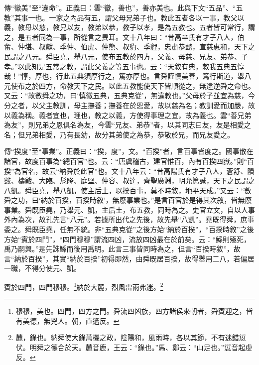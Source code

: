 {\noindent\zhuan{}\fzbyks 傳“徽美”至“違命”。正義曰：雲“徽，善也”，善亦美也。此與下文“五品”、“五教”其事一也。一家之內品有五，謂父母兄弟子也。教此五者各以一事，教父以義，教母以慈，教兄以友，教弟以恭，教子以孝，是為五教也。五者皆可常行，謂之，是五者同為一事，所從言之異耳。文十八年曰：“昔高辛氏有才子八人，伯奮、仲堪、叔獻、季仲、伯虎、仲熊、叔豹、季貍，忠肅恭懿，宣慈惠和，天下之民謂之八元。舜臣堯，舉八元，使布五教於四方，父義、母慈、兄友、弟恭、子孝。”以此知是五常之教，謂此父義之等五事也。云：“天敘有典，敕我五典五惇哉！”惇，厚也，行此五典須厚行之，篤亦厚也。言舜謹慎美善，篤行斯道，舉八元使布之於四方，命教天下之民。以此五教能使天下皆順從之，無違逆舜之命也。又云：“故數舜之功，曰‘慎徽五典，五典克從’，無違教也。”父母於子並宜為慈，今分之者，以父主教訓，母主撫養；撫養在於恩愛，故以慈為名；教訓愛而加嚴，故以義為稱。義者宜也，理也，教之以義，方使得事理之宜，故為義也。雲“善兄弟為友”，則兄弟之恩俱名為友，今雲“兄友、弟恭”者，以其同志曰友，友是相愛之名；但兄弟相愛，乃有長幼，故分其弟使之為恭，恭敬於兄，而兄友愛之。 \par}

{\noindent\zhuan{}\fzbyks 傳“揆度”至“事業”。正義曰：“揆，度”，文。“百揆”者，言百事皆度之。國事散在諸官，故度百事為“總百官”也。云：“唐虞稽古，建官惟百，內有百揆四嶽。”則“百揆”為官名，故云“納舜於此官”也。文十八年云：“昔高陽氏有才子八人，蒼舒、隤敱、檮戭、大臨、尨降、庭堅、仲容、叔達，齊聖廣淵，明允篤誠，天下之民謂之八凱。舜臣堯，舉八凱，使主后土，以揆百事，莫不時敘，地平天成。”又云：“數舜之功，曰‘納於百揆，百揆時敘’，無廢事業也。”是言百官於是得其次敘，皆無廢事業。舜既臣堯，乃舉元、凱，主后土，布五教，同時為之。史官立文，自以人事外內為次，故孔先言“八元”。若據所出代之先後，故先舉“八凱”。堯既得舜，庶事委之。舜既臣堯，任無不統。非“五典克從”之後方始“納於百揆”，“百揆時敘”之後方始“賓於四門”，“四門穆穆”謂流四凶，流放四凶最在於前矣。云：“鯀則殛死，禹乃嗣興。”是先誅鯀而後用禹明。此言三事皆同時為之，但言“百揆時敘”，故言“納於百揆”，其實“納於百揆”初得即然，由舜既居百揆，故得舉用二八，若偏居一職，不得分使元、凱。 \par}

賓於四門，四門穆穆。\footnote{穆穆，美也。四門，四方之門。舜流四凶族，四方諸侯來朝者，舜賓迎之，皆有美德，無兇人。朝，直遙反。}納於大麓，烈風雷雨弗迷。\footnote{麓，錄也。納舜使大錄萬機之政，陰陽和，風雨時，各以其節，不有迷錯愆伏。明舜之德合於天。麓音鹿，王云：“錄也。”馬、鄭云：“山足也。”愆音起虔反。}

